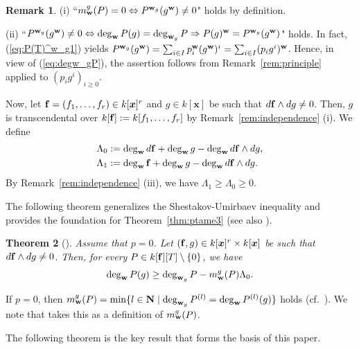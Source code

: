 \documentclass{amsart}
\theoremstyle{plain}
\newtheorem{thm}{Theorem}[section]
\theoremstyle{definition}
\newtheorem{rem}[thm]{Remark}
\newcommand{\zs}{\{ 0\} }
\newcommand{\sm}{\setminus}
\newcommand{\nd}{\noindent}
\newcommand{\N}{{\bf N}}
\newcommand{\x}{{\boldsymbol x}}
\newcommand{\w}{{\bf w}}
\newcommand{\ff}{{\bf f}}
\newcommand{\kx}{k[\x]}
\newcommand{\degww  }{\mathop{\rm deg}_{\w }\nolimits}
\begin{document}
\begin{rem}\label{rem:m(P)=0}\rm 
(i) 
``$m_{\w }^g(P)=0\Leftrightarrow P^{\w _g}(g^{\w })\ne 0$" 
holds by definition. 



\nd (ii) 
``$P^{\w _g}(g^{\w })\ne 0
\Leftrightarrow \degww  P(g)=\deg _{\w _g}P
\Rightarrow P(g)^{\w }=P^{\w _g}(g^{\w })$" 
holds. 
In fact, 
(\ref{eq:P(T)^w_g1}) yields 
$P^{\w _g}(g^{\w })
=\sum _{i\in I}p_i^{\w }(g^{\w })^i
=\sum _{i\in I}(p_ig^i)^{\w }$. 
Hence, 
in view of (\ref{eq:degw_gP}), 
the assertion follows from 
Remark~\ref{rem:principle} applied to $(p_ig^i)_{i\ge 0} $. 
\end{rem}





Now, 
let $\ff =(f_1,\ldots ,f_r)\in \kx ^r$ and $g\in \kx $ 
be such that $d\ff \wedge dg\ne 0$. 
Then, 
$g$ is transcendental over $k[\ff ]:=k[f_1,\ldots ,f_r]$ 
by Remark~\ref{rem:independence} (i). 
We define 
\begin{equation}\label{eq:Lambdas}
\begin{aligned}
\Lambda _0&:=
\degww  d\ff +\degww  g-\degww  d\ff \wedge dg,\\ 
\Lambda _1&:=
\degww \ff +\degww g-\degww  d\ff \wedge dg.
\end{aligned}
\end{equation}
By Remark~\ref{rem:independence} (iii), 
we have $\Lambda _1\ge \Lambda _0\ge 0$. 




The following theorem generalizes 
the Shestakov-Umirbaev inequality 
\cite[Theorem~3]{SUpoisson} 
and provides the foundation for 
Theorem~\ref{thm:ptame3} 
(see also \cite{EMW,MY,Vene}). 



\begin{thm}[{\cite[Theorem 2.1]{SUineq}}]\label{thm:0SUineq}
Assume that $p=0$. 
Let $(\ff ,g)\in \kx ^r\times \kx $ 
be such that $d\ff \wedge dg\ne 0$. 
Then, for every $P\in k[\ff ][T]\sm \zs $, we have 
$$
\degww  P(g)\ge \deg _{\w _g}P-m_{\w }^g(P)\Lambda _0. 
$$
\end{thm}


If $p=0$, 
then 
$m_{\w }^g(P)
=\min \{ l\in \N \mid \deg _{\w _g}P^{(l)}=\degww  P^{(l)}(g)\} $ 
holds (cf.\ \cite[Lemma 3.1~(ii)]{SUineq}). 
We note that \cite{SUineq} takes this as a definition of $m_{\w }^g(P)$. 


The following theorem is the key result that forms the basis of this paper. 
\end{document}
